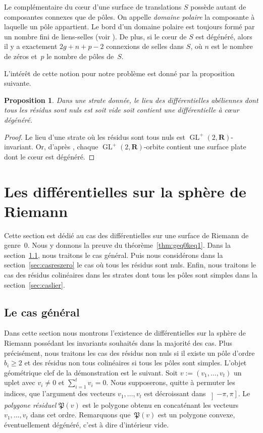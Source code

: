 \documentclass[11pt]{article}
\numberwithin{equation}{section}\renewcommand{\proofname}{Démonstration}
\DeclareMathOperator{\GL}{GL}
\newcommand{\RR}{\mathbf{R}}
\newtheorem{prop}[thm]{Proposition}
\theoremstyle{definition}
\begin{document}
Le complémentaire du cœur d'une surface de translations $S$ possède autant de composantes connexes que de pôles. On appelle \textit{domaine polaire} la composante à laquelle un pôle appartient. Le bord d'un domaine polaire est toujours formé par un nombre fini de liens-selles (voir \cite[Lem.\,2.1]{tahar}). De plus, si le cœur de $S$ est dégénéré, alors il y a exactement $2g+n+p-2$ connexions de selles dans $S$, où $n$ est le nombre de zéros et~$p$ le nombre de pôles de~$S$.

L'intérêt de cette notion pour notre problème est donné par la proposition suivante.
\begin{prop}\label{prop:coeurdege}
Dans une strate donnée, le lieu des différentielles abéliennes dont tous les résidus sont nuls est soit vide soit contient une différentielle à cœur dégénéré.
\end{prop}

\begin{proof}
Le lieu d'une strate où les résidus sont tous nuls est $\GL^{+}(2,\RR)$-invariant. Or, d'après \cite[Lem.\,2.2]{tahar}, chaque $\GL^{+}(2,\RR)$-orbite contient une surface plate dont le cœur est dégénéré.
\end{proof}

\section{Les différentielles sur la sphère de Riemann}
\label{sec:g0}

Cette section est dédié au cas des différentielles sur une surface de Riemann de genre~$0$. Nous y donnons la preuve du théorème~\ref{thm:geq0keq1}. Dans la section~\ref{sec:geng0}, nous traitons le cas général. Puis nous considérons dans la section~\ref{sec:casreszero} le cas où tous les résidus sont nuls. Enfin, nous traitons le cas des résidus colinéaires dans les strates dont tous les pôles sont simples dans la section~\ref{sec:caslier}.\enlargethispage{\baselineskip}%

\subsection{Le cas général}
\label{sec:geng0}
Dans cette section nous montrons l'existence de différentielles sur la sphère de Riemann possédant les invariants souhaités dans la majorité des cas. Plus précisément, nous traitons les cas des résidus non nuls si il existe un pôle d'ordre $b_{i}\geq2$ et des résidus non tous colinéaires si tous les pôles sont simples.
L'objet géométrique clef de la démonstration est le suivant. Soit $v:=(v_1,\ldots, v_{t})$ un uplet avec $v_{i}\neq 0$ et $\sum_{i=1}^{t}v_{i}=0$. Nous supposerons, quitte à permuter les indices, que l'argument des vecteurs $v_{1},\ldots,v_{t}$ est décroissant dans $\left]-\pi,\pi\right]$.
Le \emph{polygone résiduel } $\mathfrak{P}(v)$ est le polygone obtenu en concaténant les vecteurs $v_{1}, \ldots,v_{t}$ dans cet ordre. Remarquons que~$\mathfrak{P}(v)$ est un polygone convexe, éventuellement dégénéré, c'est à dire d'intérieur vide.
\end{document}
